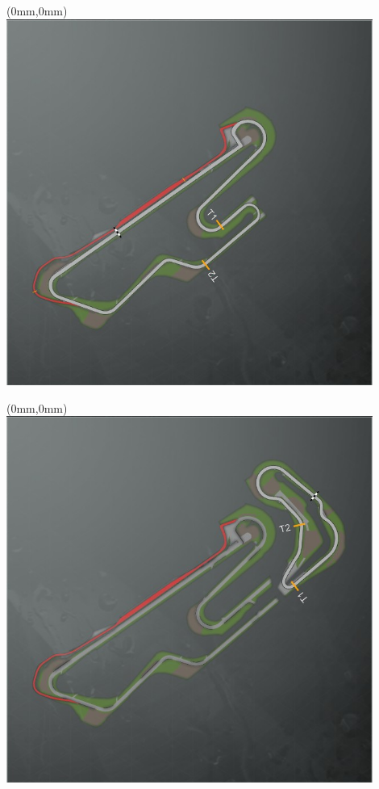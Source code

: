 \null\newpage
\begin{textblock*}{30mm}(0mm,0mm)%
\includegraphics[width=120mm]{TR/2015-05-20_00046.png}
\end{textblock*}
\null\newpage
\begin{textblock*}{30mm}(0mm,0mm)%
\includegraphics[width=120mm]{TR/2015-05-20_00047.png}
\end{textblock*}
